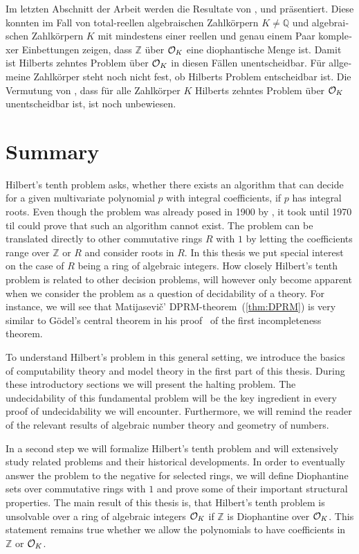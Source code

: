 \begin{german}
Im letzten Abschnitt der Arbeit werden die Resultate von \textcite{Denef1980},
\textcite{Pheidas1988} und \textcite{Shlapentokh1989} präsentiert. Diese
konnten im Fall von total-reellen algebraischen Zahlkörpern \(K ≠ ℚ\)
und algebraischen Zahlkörpern \(K\) mit mindestens einer reellen und genau einem
Paar komplexer Einbettungen zeigen, dass \(ℤ\) über \(\mathcal{O}_{K}\) eine
diophantische Menge ist. Damit ist Hilberts zehntes Problem über \(\mathcal{O}_{K}\) in
diesen Fällen unentscheidbar. Für allgemeine Zahlkörper steht noch nicht fest,
ob Hilberts Problem entscheidbar ist. Die Vermutung von \textcite{Denef1978},
dass für alle Zahlkörper \(K\) Hilberts zehntes Problem über \(\mathcal{O}_{K}\)
unentscheidbar ist, ist noch unbewiesen.
\end{german}
\clearpage

\section{Summary}

Hilbert's tenth problem asks, whether there exists an algorithm that can decide
for a given multivariate polynomial \(p\) with integral coefficients, if \(p\)
has integral roots. Even though the problem was already posed in 1900 by
\textcite{Hilbert1900}, it took until 1970 til \textcite{Matijasevic1970} could
prove that such an algorithm cannot exist. The problem can be translated
directly to other commutative rings \(R\) with \(1\) by letting the coefficients
range over \(ℤ\) or \(R\) and consider roots in \(R\). In this thesis we put
special interest on the case of \(R\) being a ring of algebraic integers. How
closely Hilbert's tenth problem is related to other decision problems, will
however only become apparent when we consider the problem as a question of
decidability of a theory. For instance, we will see that Matijasevič'
\textsc{DPRM}-theorem~(\ref{thm:DPRM}) is very similar to Gödel's central
theorem in his proof~\cite{Goedel1931} of the first incompleteness theorem.

To understand Hilbert's problem in this general setting, we introduce the basics
of computability theory and model theory in the first part of this thesis.
During these introductory sections we will present the halting problem. The
undecidability of this fundamental problem will be the key ingredient in every
proof of undecidability we will encounter. Furthermore, we will remind the
reader of the relevant results of algebraic number theory and geometry of
numbers.

In a second step we will formalize Hilbert's tenth problem and will extensively
study related problems and their historical developments. In order to eventually
answer the problem to the negative for selected rings, we will define
Diophantine sets over commutative rings with \(1\) and prove some of their
important structural properties. The main result of this thesis is, that
Hilbert's tenth problem is unsolvable over a ring of algebraic integers
\(\mathcal{O}_{K}\) if \(ℤ\) is Diophantine over \(\mathcal{O}_{K}\). This statement remains
true whether we allow the polynomials to have coefficients in \(ℤ\) or
\(\mathcal{O}_{K}\).

